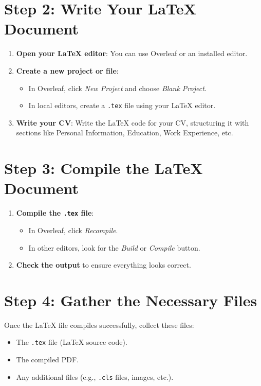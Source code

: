 \documentclass[a4paper,12pt]{article}
\begin{document}
\section{Step 2: Write Your LaTeX Document}
\begin{enumerate}
    \item \textbf{Open your LaTeX editor}: You can use Overleaf or an installed editor.
    \item \textbf{Create a new project or file}:
    \begin{itemize}
        \item In Overleaf, click \textit{New Project} and choose \textit{Blank Project}.
        \item In local editors, create a \texttt{.tex} file using your LaTeX editor.
    \end{itemize}
    \item \textbf{Write your CV}: Write the LaTeX code for your CV, structuring it with sections like Personal Information, Education, Work Experience, etc.
\end{enumerate}

\section{Step 3: Compile the LaTeX Document}
\begin{enumerate}
    \item \textbf{Compile the \texttt{.tex} file}: 
    \begin{itemize}
        \item In Overleaf, click \textit{Recompile}.
        \item In other editors, look for the \textit{Build} or \textit{Compile} button.
    \end{itemize}
    \item \textbf{Check the output} to ensure everything looks correct.
\end{enumerate}

\section{Step 4: Gather the Necessary Files}
Once the LaTeX file compiles successfully, collect these files:
\begin{itemize}
    \item The \texttt{.tex} file (LaTeX source code).
    \item The compiled PDF.
    \item Any additional files (e.g., \texttt{.cls} files, images, etc.).
\end{itemize}
\end{document}
